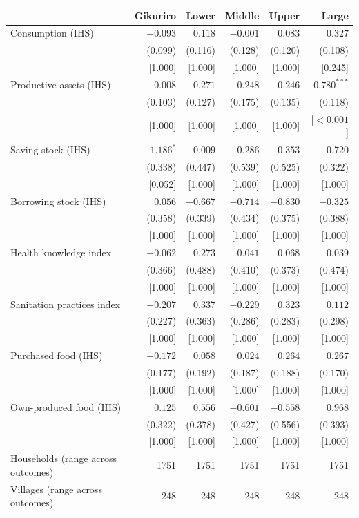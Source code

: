 \begin{tabular}{lrrrrr}
\toprule
 & Gikuriro & Lower & Middle & Upper & Large \\
\midrule
Consumption (IHS) & $-0.093$ & $0.118$ & $-0.001$ & $0.083$ & $0.327$ \\
 & (0.099) & (0.116) & (0.128) & (0.120) & (0.108) \\
 & [1.000] & [1.000] & [1.000] & [1.000] & [0.245] \\
Productive assets (IHS) & $0.008$ & $0.271$ & $0.248$ & $0.246$ & $0.780^{***}$ \\
 & (0.103) & (0.127) & (0.175) & (0.135) & (0.118) \\
 & [1.000] & [1.000] & [1.000] & [1.000] & [$<0.001$] \\
Saving stock (IHS) & $1.186^{*}$ & $-0.009$ & $-0.286$ & $0.353$ & $0.720$ \\
 & (0.338) & (0.447) & (0.539) & (0.525) & (0.322) \\
 & [0.052] & [1.000] & [1.000] & [1.000] & [1.000] \\
Borrowing stock (IHS) & $0.056$ & $-0.667$ & $-0.714$ & $-0.830$ & $-0.325$ \\
 & (0.358) & (0.339) & (0.434) & (0.375) & (0.388) \\
 & [1.000] & [1.000] & [1.000] & [1.000] & [1.000] \\
Health knowledge index & $-0.062$ & $0.273$ & $0.041$ & $0.068$ & $0.039$ \\
 & (0.366) & (0.488) & (0.410) & (0.373) & (0.474) \\
 & [1.000] & [1.000] & [1.000] & [1.000] & [1.000] \\
Sanitation practices index & $-0.207$ & $0.337$ & $-0.229$ & $0.323$ & $0.112$ \\
 & (0.227) & (0.363) & (0.286) & (0.283) & (0.298) \\
 & [1.000] & [1.000] & [1.000] & [1.000] & [1.000] \\
Purchased food (IHS) & $-0.172$ & $0.058$ & $0.024$ & $0.264$ & $0.267$ \\
 & (0.177) & (0.192) & (0.187) & (0.188) & (0.170) \\
 & [1.000] & [1.000] & [1.000] & [1.000] & [1.000] \\
Own-produced food (IHS) & $0.125$ & $0.556$ & $-0.601$ & $-0.558$ & $0.968$ \\
 & (0.322) & (0.378) & (0.427) & (0.556) & (0.393) \\
 & [1.000] & [1.000] & [1.000] & [1.000] & [1.000] \\
Households (range across outcomes) & 1751 & 1751 & 1751 & 1751 & 1751 \\
Villages (range across outcomes) & 248 & 248 & 248 & 248 & 248 \\
\bottomrule
\end{tabular}
